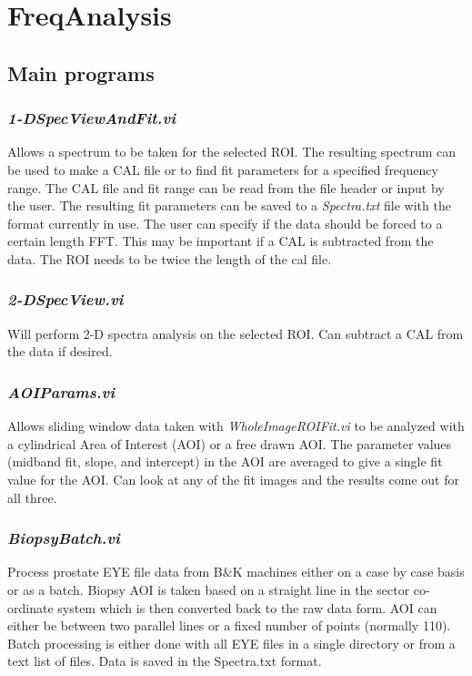 \documentclass[10pt]{article}
\begin{document}
\section{FreqAnalysis}


\subsection{Main programs}

\subsubsection{{\it 1-DSpecViewAndFit.vi}}

Allows a spectrum to be taken for the selected ROI. The resulting
spectrum can be used to make a CAL file or to find fit parameters
for a specified frequency range. The CAL file and fit range can be
read from the file header or input by the user. The resulting fit
parameters can be saved to a {\it Spectra.txt} file with the
format currently in use. The user can specify if the data should
be forced to a certain length FFT. This may be important if a CAL
is subtracted from the data. The ROI needs to be twice the length
of the cal file.

\subsubsection{{\it 2-DSpecView.vi}}

Will perform  2-D spectra analysis on the selected ROI. Can
subtract a CAL from the data if desired.


\subsubsection{{\it AOIParams.vi}}

Allows sliding window data taken with {\it WholeImageROIFit.vi} to
be analyzed with a cylindrical Area of Interest (AOI) or a free
drawn AOI. The parameter values (midband fit, slope, and
intercept) in the AOI are averaged to give a single fit value for
the AOI. Can look at any of the fit images and the results come
out for all three.

\subsubsection{{\it BiopsyBatch.vi}}

Process prostate EYE file data from B\&K machines either on a case
by case basis or as a batch. Biopsy AOI is taken based on a
straight line in the sector co-ordinate system which is then
converted back to the raw data form. AOI can either be between two
parallel lines or a fixed number of points (normally 110). Batch
processing is either done with all EYE files in a single directory
or from a text list of files. Data is saved in the Spectra.txt
format.
\end{document}
